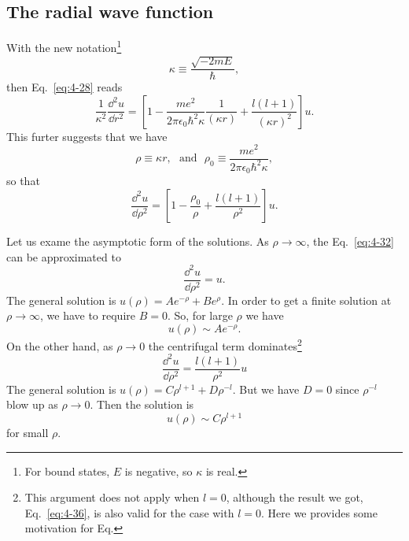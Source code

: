 \subsection{The radial wave function}
With the new notation\footnote{For bound states, $E$ is negative, so $\kappa$ is real.}
\begin{equation}
  \label{eq:4-29}
  \kappa \equiv \frac{\sqrt{-2mE}}{\hbar},
\end{equation}
then Eq.~\eqref{eq:4-28} reads
\begin{equation}
  \label{eq:4-30}
  \frac{1}{\kappa^{2}} \frac{\dd^{2} u}{\dd r^{2}} = \left[ 1 - \frac{m e^{2}}{2 \pi \epsilon_{0} \hbar^{2} \kappa} \frac{1}{\left(\kappa r\right)} + \frac{l \left( l+1 \right)}{\left( \kappa r \right)^2} \right] u.
\end{equation}
This furter suggests that we have
\begin{equation}
  \label{eq:4-31}
  \rho \equiv \kappa r, ~ ~ ~  \text{and} ~ ~ ~ \rho_0 \equiv \frac{me^{2}}{2\pi \epsilon_{0} \hbar^{2} \kappa},
\end{equation}
so that
\begin{equation}
  \label{eq:4-32}
  \frac{\dd^{2} u}{\dd \rho^{2}} = \left[ 1 - \frac{\rho_{0}}{\rho} + \frac{l \left(l+1\right)}{\rho^{2}} \right] u.
\end{equation}

Let us exame the asymptotic form of the solutions.
As $\rho \to \infty$, the Eq.~\eqref{eq:4-32} can be approximated to
\begin{equation}
  \label{eq:4-33}
  \frac{\dd^{2} u}{\dd \rho^2} = u.
\end{equation}
The general solution is $u \left( \rho \right) = A e^{-\rho} + B e^{\rho}$.
In order to get a finite solution at $\rho \to \infty$, we have to require $B=0$.
So, for large $\rho$ we have
\begin{equation}
  \label{eq:4-34}
  u \left( \rho \right) \sim A e^{-\rho}.
\end{equation}
On the other hand, as $\rho \to 0$ the centrifugal term dominates\footnote{This argument does not apply when $l=0$, although the result we got, Eq.~\eqref{eq:4-36}, is also valid for the case with $l=0$. Here we provides some motivation for Eq. }
\begin{equation}
  \label{eq:4-35}
  \frac{\dd^{2} u}{\dd \rho^{2}} = \frac{l \left( l+1 \right)}{\rho^{2}}  u
\end{equation}
The general solution is $u \left( \rho \right) = C \rho^{l+1} + D \rho^{-l}$.
But we have $D = 0$ since $\rho^{-l}$ blow up as $ \rho \to 0$.
Then the solution is
\begin{equation}
  \label{eq:4-36}
  u \left( \rho \right) \sim C \rho^{l+1}
\end{equation}
for small $\rho$.

